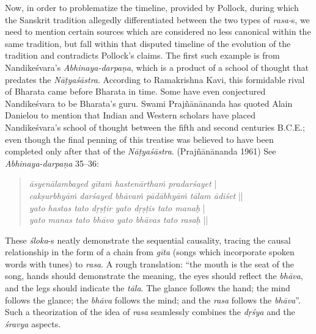 Now, in order to problematize the timeline, provided by Pollock, during which the Sanskrit tradition allegedly differentiated between the two types of \textsl{rasa-}s, we need to mention certain sources which are considered no less canonical within the same tradition, but fall within that disputed timeline of the evolution of the tradition and contradicts Pollock’s claims. The first such example is from Nandikeśvara’s \textsl{Abhinaya-darpaṇa}, which is a product of a school of thought that predates the \textsl{Nāṭyaśāstra}. According to Ramakrishna Kavi, this formidable rival of Bharata came before Bharata in time. Some have even conjectured Nandikeśvara to be Bharata’s guru. Swami Prajñānānanda has quoted Alain Danielou to mention that Indian and Western scholars have placed Nandikeśvara’s school of thought between the fifth and second centuries B.C.E.; even though the final penning of this treatise was believed to have been completed only after that of the \textsl{Nāṭyaśāstra}. (Prajñānānanda 1961) See \textsl{Abhinaya-darpaṇa} 35--36:
\begin{quote}
\textsl{āsyenālambayed gītaṁ hastenārthaṁ pradarśayet} |  \\
\textsl{cakṣurbhyāṁ darśayed bhāvaṁ pādābhyāṁ tālam ādiśet} ||   \\
\textsl{yato hastas tato dṛṣṭir yato dṛṣṭis tato manaḥ} | \\
\textsl{yato manas tato bhāvo yato bhāvas tato rasaḥ} || 
\end{quote}

These \textsl{śloka}-s neatly demonstrate the sequential causality, tracing the causal relationship in the form of a chain from \textsl{gīta} (songs which incorporate spoken words with tunes) to \textsl{rasa}. A rough translation: “the mouth is the seat of the song, hands should demonstrate the meaning, the eyes should reflect the \textsl{bhāva}, and the legs should indicate the \textsl{tāla}. The glance follows the hand; the mind follows the glance; the \textsl{bhāva} follows the mind; and the \textsl{rasa} follows the \textsl{bhāva}''. Such a theorization of the idea of \textsl{rasa} seamlessly combines the \textsl{dṛśya} and the \textsl{śravya} aspects. 

